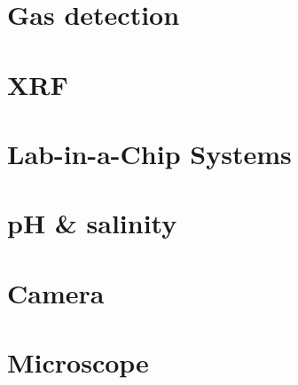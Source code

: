 \section{Gas detection}

\section{XRF}

\section{Lab-in-a-Chip Systems}


\section{pH \& salinity}

\section{Camera}

\section{Microscope}
